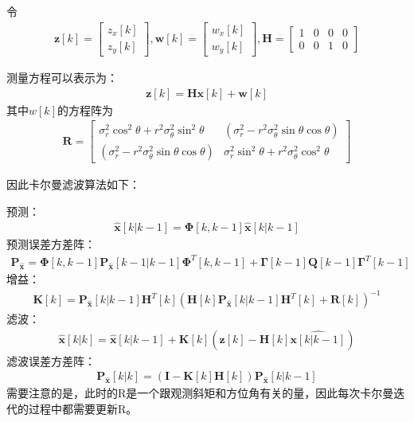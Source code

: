 \documentclass[fontset=windows]{article}
\numberwithin{figure}{section}
\begin{document}
令
\begin{align*}
    \mathbf{z}[k]=
    \begin{bmatrix}
        z_x[k] \\
        z_y[k]
    \end{bmatrix},
    \mathbf{w}[k]=
    \begin{bmatrix}
        w_x[k] \\
        w_y[k]
    \end{bmatrix},
    \mathbf{H}=
    \begin{bmatrix}
        1 & 0 & 0 & 0 \\
        0 & 0 & 1 & 0
    \end{bmatrix}
\end{align*}

测量方程可以表示为：
\begin{align*}
    \mathbf{z}[k]=\mathbf{Hx}[k]+\mathbf{w}[k]
\end{align*}
其中\(w[k]\)的方程阵为
\begin{align*}
    \mathbf{R}=
    \begin{bmatrix}
        \sigma^2_r\cos^2\theta+r^2\sigma^2_{\theta}\sin^2\theta
         & (\sigma^2_r-r^2\sigma^2_{\theta}\sin\theta\cos\theta)   \\
        (\sigma^2_r-r^2\sigma^2_{\theta}\sin\theta\cos\theta)
         & \sigma^2_r\sin^2\theta+r^2\sigma^2_{\theta}\cos^2\theta
    \end{bmatrix}
\end{align*}

因此卡尔曼滤波算法如下：

预测：
\begin{align*}
    \hat{\mathbf{x}}[k|k-1]=\boldsymbol{\Phi}[k,k-1]\hat{\mathbf{x}}[k|k-1]
\end{align*}
预测误差方差阵：
\begin{align*}
    \mathbf{P}_{\hat{\mathbf{x}}}=
    \boldsymbol{\Phi}[k,k-1]\mathbf{P}_{\hat{\mathbf{x}}}[k-1|k-1]
    \boldsymbol{\Phi}^T[k,k-1]+\boldsymbol{\Gamma}[k-1]\mathbf{Q}[k-1]\boldsymbol{\Gamma}^T[k-1]
\end{align*}
增益：
\begin{align*}
    \mathbf{K}[k]=\mathbf{P}_{\hat{\mathbf{x}}}[k|k-1]\mathbf{H}^T[k]
    (\mathbf{H}[k]\mathbf{P}_{\hat{\mathbf{x}}}[k|k-1]\mathbf{H}^T[k]+\mathbf{R}[k])^{-1}
\end{align*}
滤波：
\begin{align*}
    \hat{\mathbf{x}}[k|k]=\hat{\mathbf{x}}[k|k-1]+\mathbf{K}[k]
    (\mathbf{z}[k]-\mathbf{H}[k]\hat{\mathbf{x}[k|k-1]})
\end{align*}
滤波误差方差阵：
\begin{align*}
    \mathbf{P}_{\hat{\mathbf{x}}}[k|k]=(\mathbf{I}-\mathbf{K}[k]\mathbf{H}[k])
    \mathbf{P}_{\hat{\mathbf{x}}}[k|k-1]
\end{align*}
需要注意的是，此时的R是一个跟观测斜矩和方位角有关的量，因此每次卡尔曼迭代的过程中都需要更新R。
\end{document}
